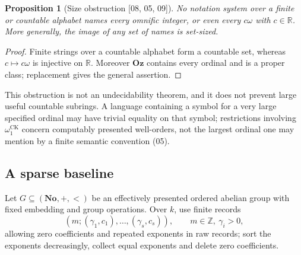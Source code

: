 \documentclass[11pt,oneside]{article}
\numberwithin{equation}{section}
\newtheorem{proposition}[proposition]{Proposition}
\theoremstyle{definition}
\theoremstyle{remark}
\newcommand{\No}{\mathbf{No}}
\newcommand{\Oz}{\mathbf{Oz}}
\newcommand{\Z}{\mathbb Z}
\newcommand{\R}{\mathbb R}
\newcommand{\CK}{\omega_1^{\mathrm{CK}}}
\newcommand{\src}[1]{\textup{\textsf{\small[#1]}}}
\begin{document}
\begin{proposition}[Size obstruction \src{08, 05, 09}]\label{onot:prop:size}
No notation system over a finite or countable alphabet names every omnific
integer, or even every $c\omega$ with $c\in\R$. More generally, the image of any
set of names is set-sized.
\end{proposition}
\begin{proof}
Finite strings over a countable alphabet form a countable set, whereas
$c\mapsto c\omega$ is injective on $\R$. Moreover $\Oz$ contains every ordinal
and is a proper class; replacement gives the general assertion.
\end{proof}
This obstruction is not an undecidability theorem, and it does not prevent
large useful countable subrings. A language containing a symbol for a very large
specified ordinal may have trivial equality on that symbol; restrictions
involving $\CK$ concern computably presented well-orders, not the largest ordinal
one may mention by a finite semantic convention (05).

\subsection{A sparse baseline}\label{onot:sub:sparse}

Let $G\subseteq(\No,+,<)$ be an effectively presented ordered abelian group
with fixed embedding and group operations. Over $k$, use finite records
\begin{equation}\label{onot:eq:sparse}
 (m;(\gamma_1,c_1),\ldots,(\gamma_s,c_s)),\qquad m\in\Z,\ \gamma_i>0,
\end{equation}
allowing zero coefficients and repeated exponents in raw records; sort the
exponents decreasingly, collect equal exponents and delete zero coefficients.
\end{document}
